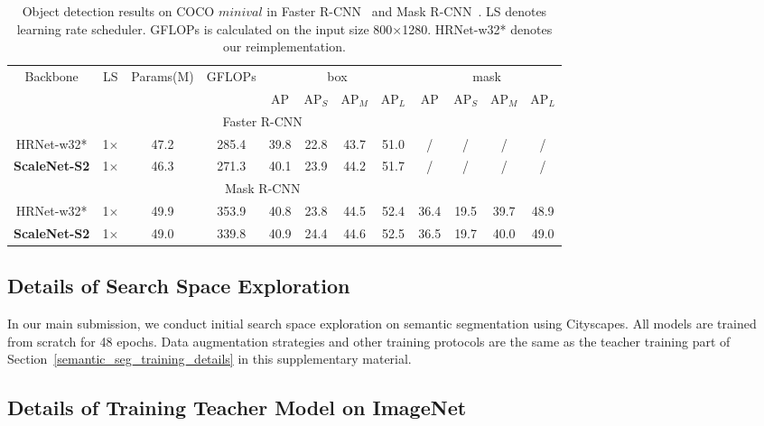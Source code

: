 \documentclass[final]{cvpr}
\newcommand{\netname}{ScaleNet\xspace}
\begin{document}
\begin{table*}[t]
\centering
\caption{Object detection results on COCO $minival$ in Faster R-CNN~\cite{ren2015faster} and Mask R-CNN~\cite{he2017mask}. LS denotes learning rate scheduler. GFLOPs is calculated on the input size 800×1280. HRNet-w32* denotes our reimplementation.} 
\begin{tabular}{c|c|c|c|cccc|cccc} 
\hline
\multirow{2}{*}{Backbone}  & \multirow{2}{*}{LS} & \multirow{2}{*}{Params(M)} & \multirow{2}{*}{GFLOPs}   & \multicolumn{4}{|c|}{box}& \multicolumn{4}{c}{mask}\\
\cline{5-12}
&&& & AP   & AP$_S$  & AP$_M$  & AP$_{L}$  & AP  & AP$_{S}$ & AP$_{M}$ & AP$_{L}$   \\ 
\hline 
\multicolumn{11}{c}{Faster R-CNN~\cite{ren2015faster}} \\
\hline

HRNet-w32*    &  1$\times$ & 47.2  & 285.4 & 39.8 & 22.8 & 43.7 & 51.0 & / & /& /& / \\
\textbf{\netname-S2}  & 1$\times$ & 46.3  &  271.3 & 40.1  & 23.9  & 44.2  & 51.7  & / &/ & /& /     \\

\hline 
\multicolumn{11}{c}{Mask R-CNN~\cite{he2017mask}} \\
\hline
HRNet-w32*   & 1$\times$ &  49.9 &  353.9  &  40.8 & 23.8 & 44.5 & 52.4 & 36.4 & 19.5 & 39.7  & 48.9 \\
\textbf{\netname-S2}  &   1$\times$  & 49.0  &  339.8  & 40.9 & 24.4 & 44.6 & 52.5 & 36.5 & 19.7 & 40.0  & 49.0   \\
\hline
\end{tabular}



\label{tab:object_detection}
\end{table*}


\subsection{Details of Search Space Exploration}
In our main submission, we conduct initial search space exploration on semantic segmentation using Cityscapes. All models are trained from scratch for 48 epochs. Data augmentation strategies and other training protocols are the same as the teacher training part of Section~\ref{semantic_seg_training_details} in this supplementary material.

\subsection{Details of Training Teacher Model on ImageNet}
\end{document}
